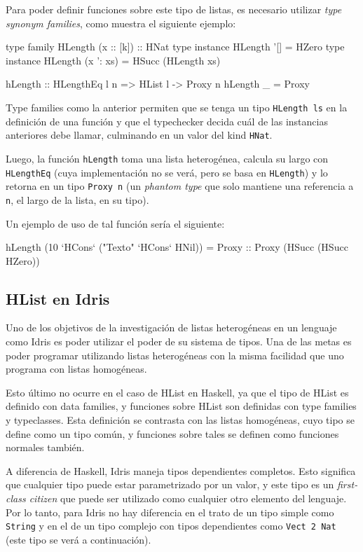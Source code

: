 Para poder definir funciones sobre este tipo de listas, es necesario utilizar \textit{type synonym families}, como muestra el siguiente ejemplo:

\begin{code}
type family HLength (x :: [k]) :: HNat
type instance HLength '[] = HZero
type instance HLength (x ': xs) = HSucc (HLength xs)

hLength   :: HLengthEq l n => HList l -> Proxy n
hLength _ =  Proxy
\end{code}

Type families como la anterior permiten que se tenga un tipo \texttt{HLength ls} en la definición de una función y que el typechecker decida cuál de las instancias anteriores debe llamar, culminando en un valor del kind \texttt{HNat}.

Luego, la función \texttt{hLength} toma una lista heterogénea, calcula su largo con \texttt{HLengthEq} (cuya implementación no se verá, pero se basa en \texttt{HLength}) y lo retorna en un tipo \texttt{Proxy n} (un \textit{phantom type} que solo mantiene una referencia a \texttt{n}, el largo de la lista, en su tipo).

Un ejemplo de uso de tal función sería el siguiente:

\begin{code}
hLength (10 `HCons` ("Texto" `HCons` HNil)) = 
  Proxy :: Proxy (HSucc (HSucc HZero))
\end{code}

\subsection{HList en Idris}

Uno de los objetivos de la investigación de listas heterogéneas en un lenguaje como Idris es poder utilizar el poder de su sistema de tipos. Una de las metas es poder programar utilizando listas heterogéneas con la misma facilidad que uno programa con listas homogéneas.

Esto último no ocurre en el caso de HList en Haskell, ya que el tipo de HList es definido con data families, y funciones sobre HList son definidas con type families y typeclasses. Esta definición se contrasta con las listas homogéneas, cuyo tipo se define como un tipo común, y funciones sobre tales se definen como funciones normales también.

A diferencia de Haskell, Idris maneja tipos dependientes completos. Esto significa que cualquier tipo puede estar parametrizado por un valor, y este tipo es un \textit{first-class citizen} que puede ser utilizado como cualquier otro elemento del lenguaje. Por lo tanto, para Idris no hay diferencia en el trato de un tipo simple como \texttt{String} y en el de un tipo complejo con tipos dependientes como \texttt{Vect 2 Nat} (este tipo se verá a continuación).

